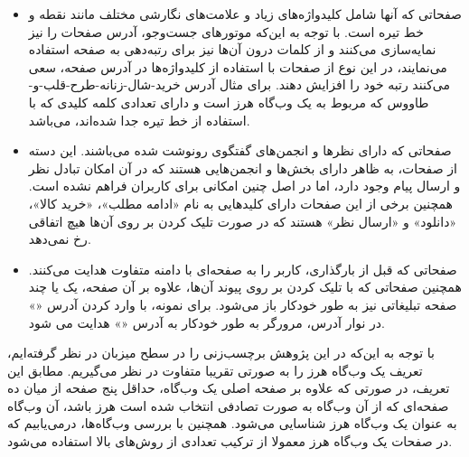 \documentclass[twoside, a4paper,11pt]{book}
\numberwithin{equation}{chapter}
\numberwithin{table}{chapter}
\numberwithin{figure}{chapter}
\numberwithin{equation}{chapter}
\begin{document}
\begin{itemize}


\item
صفحاتی که  آن­ها شامل کلیدواژه‌های زیاد و علامت‌های نگارشی مختلف مانند نقطه و خط تیره است. با توجه به این‌که موتورهای جست‌و‌جو، آدرس صفحات را نیز نمایه‌سازی می‌کنند و از کلمات درون آن‌ها نیز برای رتبه‌دهی به صفحه استفاده می‌نمایند، در این نوع از صفحات با استفاده از کلیدواژه‌ها در آدرس صفحه، سعی می‌کنند رتبه خود را افزایش دهند.
برای مثال آدرس خرید-شال-زنانه-طرح-قلب-و-طاووس که مربوط به یک وب‌گاه هرز است و دارای تعدادی کلمه کلیدی که با استفاده از خط تیره جدا شده‌اند، می‌باشد.
\item
صفحاتی که دارای نظرها و انجمن‌های گفتگوی رونوشت شده می‌باشند. این دسته از صفحات، به ظاهر دارای بخش‌ها و انجمن‌هایی هستند که در آن امکان تبادل نظر و ارسال پیام وجود دارد، اما در اصل چنین امکانی برای کاربران فراهم نشده است. همچنین برخی از این صفحات دارای کلیدهایی به نام «ادامه مطلب»، «خرید کالا»، «دانلود» و «ارسال نظر» هستند که در صورت تلیک کردن بر روی آن‌ها هیچ اتفاقی رخ نمی‌دهد. 
\item
صفحاتی که قبل از بارگذاری، کاربر را به صفحه‌ای با دامنه متفاوت هدایت می‌کنند. همچنین صفحاتی که با تلیک کردن بر روی پیوند آن‌ها، علاوه بر آن صفحه، یک یا چند صفحه تبلیغاتی نیز به طور خودکار باز می‌شود.  
برای نمونه، با وارد کردن آدرس «» در نوار آدرس، مرورگر به طور خودکار به آدرس «» هدایت می شود.
\end{itemize}

با توجه به این‌که در این پژوهش برچسب‌زنی را در سطح میزبان در نظر گرفته‌ایم، تعریف یک وب‌گاه هرز را به صورتی تقریبا متفاوت در نظر می‌گیریم. 
مطابق این تعریف، در صورتی که علاوه بر صفحه  اصلی یک وب‌گاه، حداقل پنج صفحه از میان ده صفحه‌ای که از آن وب‌گاه به صورت تصادفی انتخاب شده است هرز باشد، آن وب‌گاه به عنوان یک وب‌گاه هرز شناسایی می‌شود. همچنین با بررسی وب‌گاه‌ها، درمی‌یابیم که در صفحات یک وب‌گاه هرز معمولا از ترکیب تعدادی از روش‌های بالا  استفاده می‌شود.
\end{document}
